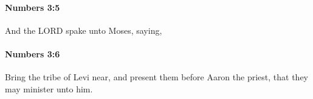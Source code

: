 		\paragraph{Numbers 3:5} %
			\label{NUMBERS-3-5}

			And the LORD spake unto Moses, saying,


		\paragraph{Numbers 3:6} %
			\label{NUMBERS-3-6}

			Bring the tribe of Levi near, and present them before Aaron the priest, that they may minister unto him.


